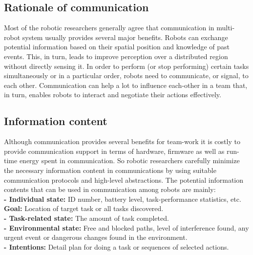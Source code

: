 \documentclass{intech}
\begin{document}
\subsection{Rationale of communication}
Most of the robotic researchers generally agree that communication in multi-robot system usually provides several major benefits. Robots can exchange potential information based on their spatial position and knowledge of past events. This, in turn, leads to improve perception over a distributed region without directly sensing it. In order to perform (or stop performing) certain tasks simultaneously or in a particular order, robots need to communicate, or signal, to each other. Communication can help a lot to influence each-other in a team that, in turn, enables robots to interact and negotiate their actions effectively.
\subsection{Information content}
Although communication provides several benefits for team-work it is costly to provide communication support in terms of hardware, firmware as well as run-time energy spent in communication. So robotic researchers carefully minimize the necessary information content in communications by using suitable communication protocols and high-level abstractions.  The potential information contents that can be used in communication among robots are mainly:\\
\textbf{- Individual state:} ID number, battery level, task-performance statistics, etc.\\
\textbf{Goal:} Location of target task or all tasks discovered.\\
\textbf{- Task-related state:} The amount of task completed.\\
\textbf{- Environmental state:} Free and blocked paths, level of interference found, any urgent event or dangerous changes found in the environment.\\
\textbf{- Intentions:} Detail plan for doing a task or sequences of selected actions.
\end{document}
